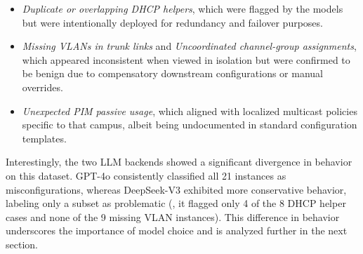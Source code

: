 \begin{itemize}
\item \textit{Duplicate or overlapping DHCP helpers}, which were flagged by the models but were intentionally deployed for redundancy and failover purposes.

\item \textit{Missing VLANs in trunk links} and \textit{Uncoordinated channel-group assignments}, which appeared inconsistent when viewed in isolation but were confirmed to be benign due to compensatory downstream configurations or manual overrides.

\item \textit{Unexpected PIM passive usage}, which aligned with localized multicast policies specific to that campus, albeit being undocumented in standard configuration templates.
\end{itemize}

Interestingly, the two LLM backends showed a significant divergence in behavior on this dataset. GPT-4o consistently classified all 21 instances as misconfigurations, whereas DeepSeek-V3 exhibited more conservative behavior, labeling only a subset as problematic (\eg, it flagged only 4 of the 8 DHCP helper cases and none of the 9 missing VLAN instances). This difference in behavior underscores the importance of model choice and is analyzed further in the next section.

\begin{table}[tb]
\centering
{}
\caption{Campus B Non-Targeted Snapshot: All configurations flagged as misconfigurations were later validated by network operators as \textbf{correct} (\ie, \textit{false positives}).}
\label{tab:grouped_misconfig_analysis}
\end{table}

